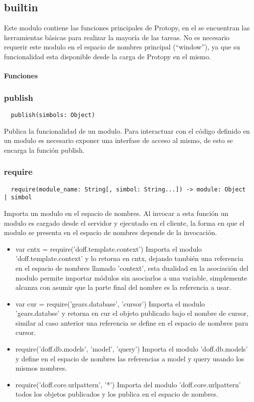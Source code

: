 \subsection{builtin}
Este modulo contiene las funciones principales de Protopy, en el se encuentran
las herramientas básicas para realizar la mayoría de las tareas.
No es necesario requerir este modulo en el espacio de nombres principal
(``window''), ya que su funcionalidad esta disponible desde la carga de Protopy
en el mismo.

\paragraph{Funciones}
\subsubsection*{publish}
\begin{verbatim}
  publish(simbols: Object)
\end{verbatim}
Publica la funcionalidad de un modulo.
Para interactuar con el código definido en un modulo es necesario
exponer una interfase de acceso al mismo, de esto se encarga la función publish.

\subsubsection*{require}
\begin{verbatim}
  require(module_name: String[, simbol: String...]) -> module: Object | simbol
\end{verbatim} 
Importa un modulo en el espacio de nombres.
Al invocar a esta función un modulo es cargado desde el servidor y ejecutado en
el cliente, la forma en que el modulo se presenta en el espacio de nombres
depende de la invocación.
\begin{itemize}
 \item{var cntx = require('doff.template.context')}
  Importa el modulo 'doff.template.context' y lo retorna en cntx, dejando
también una referencia en el espacio de nombres llamado 'context', esta dualidad
en la asociación del modulo permite importar módulos sin asociarlos a una
variable, simplemente alcanza con asumir que la parte final del nombre es la
referencia a usar.
 \item{var cur = require('gears.database', 'cursor')}
  Importa el modulo 'gears.databse' y retorna en cur el objeto publicado bajo el
nombre de cursor, similar al caso anterior una referencia se define en el
espacio de nombres para cursor.  
 \item{require('doff.db.models', 'model', 'query')}
  Importa el modulo 'doff.db.models' y define en el espacio de nombres las
referencias a model y query usando los mismos nombres.
 \item{require('doff.core.urlpattern', '*')}
  Importa del modulo 'doff.core.urlpattern' todos los objetos publicados y los
publica en el espacio de nombres.
\end{itemize}

